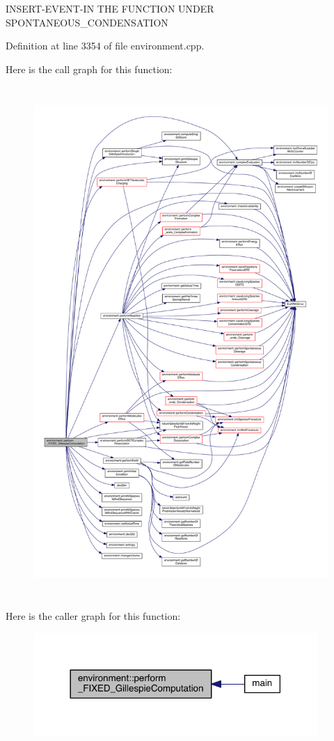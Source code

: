 I\-N\-S\-E\-R\-T-\/\-E\-V\-E\-N\-T-\/\-I\-N T\-H\-E F\-U\-N\-C\-T\-I\-O\-N U\-N\-D\-E\-R S\-P\-O\-N\-T\-A\-N\-E\-O\-U\-S\-\_\-\-C\-O\-N\-D\-E\-N\-S\-A\-T\-I\-O\-N 

Definition at line 3354 of file environment.\-cpp.



Here is the call graph for this function\-:
\nopagebreak
\begin{figure}[H]
\begin{center}
\leavevmode
\includegraphics[height=550pt]{a00014_aa4fba7d5679a16fd6ef1a9a2041779a2_cgraph}
\end{center}
\end{figure}




Here is the caller graph for this function\-:
\nopagebreak
\begin{figure}[H]
\begin{center}
\leavevmode
\includegraphics[width=306pt]{a00014_aa4fba7d5679a16fd6ef1a9a2041779a2_icgraph}
\end{center}
\end{figure}


